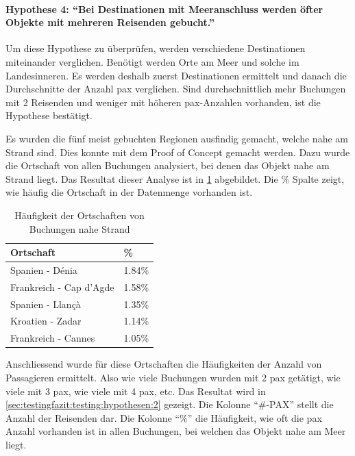 \paragraph{Hypothese 4: "`Bei Destinationen mit Meeranschluss werden öfter Objekte mit mehreren Reisenden gebucht."'} Um diese Hypothese zu überprüfen, werden verschiedene Destinationen miteinander verglichen. Benötigt werden Orte am Meer und solche im Landesinneren. Es werden deshalb zuerst Destinationen ermittelt und danach die Durchschnitte der Anzahl \gls{pax} verglichen. Sind durchschnittlich mehr Buchungen mit 2 Reisenden und weniger mit höheren \gls{pax}-Anzahlen vorhanden, ist die Hypothese bestätigt.

Es wurden die fünf meist gebuchten Regionen ausfindig gemacht, welche nahe am Strand sind. Dies konnte mit dem Proof of Concept gemacht werden. Dazu wurde die Ortschaft von allen Buchungen analysiert, bei denen das Objekt nahe am Strand liegt. Das Resultat dieser Analyse ist in \cref{sec:testingfazit:testing:hypothesen:1} abgebildet. Die \% Spalte zeigt, wie häufig die Ortschaft in der Datenmenge vorhanden ist.

\begin{table}[H] 
	\caption{Häufigkeit der Ortschaften von Buchungen nahe Strand}
	\centering
	\label{sec:testingfazit:testing:hypothesen:1}
	\begin{tabular}{ | l | l | } 
		\hline 
		\rowcolor{tableheadcolor}
		\bfseries Ortschaft & \bfseries \% \\ \hline 
		Spanien - Dénia & 1.84\% \\ \hline 
		Frankreich - Cap d'Agde & 1.58\% \\ \hline 
		Spanien - Llançà & 1.35\% \\ \hline 
		Kroatien - Zadar & 1.14\% \\ \hline 
		Frankreich - Cannes & 1.05\% \\ \hline 
	\end{tabular}
\end{table}

Anschliessend wurde für diese Ortschaften die Häufigkeiten der Anzahl von Passagieren ermittelt. Also wie viele Buchungen wurden mit 2 \gls{pax} getätigt, wie viele mit 3 \gls{pax}, wie viele mit 4 \gls{pax}, etc. Das Resultat wird in \cref{sec:testingfazit:testing:hypothesen:2} gezeigt. Die Kolonne "`\#-PAX"' stellt die Anzahl der Reisenden dar. Die Kolonne "`\%"' die Häufigkeit, wie oft die \gls{pax} Anzahl vorhanden ist in allen Buchungen, bei welchen das Objekt nahe am Meer liegt.

